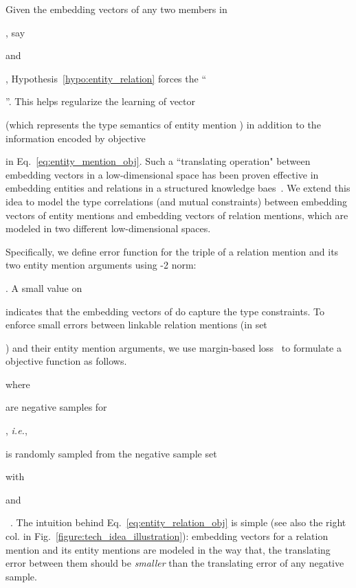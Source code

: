 \documentclass[letterpaper]{sig-alternate-2013}
\def\ie{{\sl i.e.}}
\begin{document}
Given the embedding vectors of any two members in \begin{small}\end{small}, say \begin{small}\end{small} and \begin{small}\end{small}, Hypothesis~\ref{hypo:entity_relation} forces the ``\begin{small}\end{small}''. This helps regularize the learning of vector \begin{small}\end{small} (which represents the type semantics of entity mention ) in addition to the information encoded by objective \begin{small}\end{small} in Eq.~\eqref{eq:entity_mention_obj}.
Such a ``translating operation" between embedding vectors in a low-dimensional space has been proven effective in embedding entities and relations in a structured knowledge baes~\cite{bordes2013translating}. We extend this idea to model the type correlations (and mutual constraints) between embedding vectors of entity mentions and embedding vectors of relation mentions, which are modeled in two different low-dimensional spaces.


Specifically, we define error function for the triple of a relation mention and its two entity mention arguments  using -2 norm: \begin{small}\end{small}. A small value on \begin{small}\end{small} indicates that the embedding vectors of    do capture the type constraints. To enforce small errors between linkable relation mentions (in set \begin{small}\end{small}) and their entity mention arguments, we use margin-based loss~\cite{bordes2013translating} to formulate a objective function as follows.

where \begin{small}\end{small} are negative samples for \begin{small}\end{small}, \ie, \begin{small}\end{small} is randomly sampled from the negative sample set \begin{small}\end{small} with \begin{small}\end{small} and \begin{small}\end{small}~\cite{bordes2013translating}.
The intuition behind Eq.~\eqref{eq:entity_relation_obj} is simple (see also the right col. in Fig.~\ref{figure:tech_idea_illustration}): embedding vectors for a relation mention and its entity mentions are modeled in the way that, the translating error  between them should be \textit{smaller} than the translating error of any negative sample.
\end{document}
